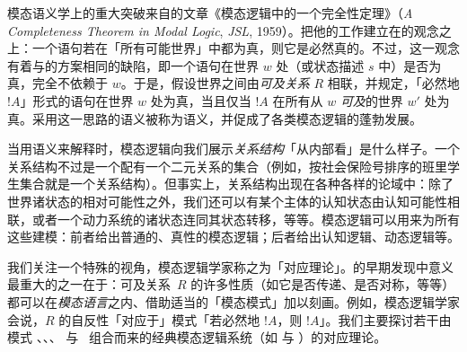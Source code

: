 \documentclass[../../../include/open-logic-section]{subfiles}
\begin{document}
模态语义学上的重大突破来自的文章《模态逻辑中的一个完全性定理》（\textit{A Completeness Theorem in Modal Logic}, \textit{JSL}, 1959）。把他的工作建立在的观念之上：一个语句若在「所有可能世界」中都为真，则它是必然真的。不过，这一观念有着与的方案相同的缺陷，即一个语句在世界 $w$ 处（或状态描述 $s$ 中）是否为真，完全不依赖于 $w$。于是，假设世界之间由\emph{可及关系} $R$ 相联，并规定，「必然地 $!A$」形式的语句在世界 $w$ 处为真，当且仅当 $!A$ 在所有从 $w$ \emph{可及}的世界 $w'$ 处为真。采用这一思路的语义被称为语义，并促成了各类模态逻辑的蓬勃发展。

当用语义来解释时，模态逻辑向我们展示\emph{关系结构}「从内部看」是什么样子。一个关系结构不过是一个配有一个二元关系的集合（例如，按社会保险号排序的班里学生集合就是一个关系结构）。但事实上，关系结构出现在各种各样的论域中：除了世界诸状态的相对可能性之外，我们还可以有某个主体的认知状态由认知可能性相联，或者一个动力系统的诸状态连同其状态转移，等等。模态逻辑可以用来为所有这些建模：前者给出普通的、真性的模态逻辑；后者给出认知逻辑、动态逻辑等。

我们关注一个特殊的视角，模态逻辑学家称之为「对应理论」。的早期发现中意义最重大的之一在于：可及关系~$R$ 的许多性质（如它是否传递、是否对称，等等）都可以在\emph{模态语言}之内、借助适当的「模态模式」加以刻画。例如，模态逻辑学家会说，$R$ 的自反性「对应于」模式「若必然地 $!A$，则 $!A$」。我们主要探讨若干由模式 、、、 与~ 组合而来的经典模态逻辑系统（如  与 ）的对应理论。
\end{document}
